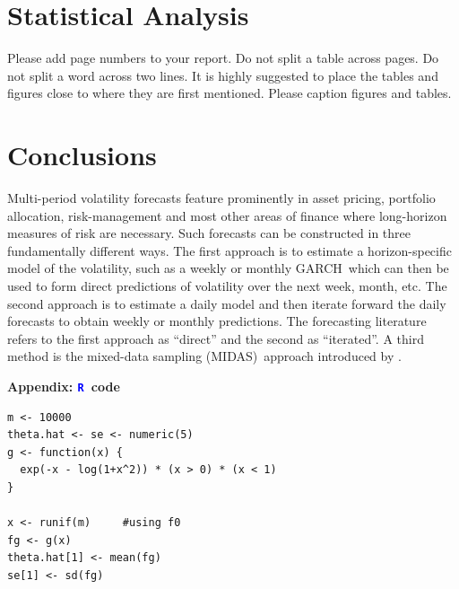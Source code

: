 \documentclass[12pt]{article}
\newcommand{\textR}[1]{\textcolor{blue}{\texttt{#1}}}
\newcommand{\R}{\textR{R}}
\begin{document}
\section{Statistical Analysis}

Please add page numbers to your report. Do not split a table across pages. Do not split a word across two lines. It is highly suggested to place the tables and figures close to where they are first mentioned. Please caption figures and tables.

\section{Conclusions}


Multi-period volatility forecasts feature prominently in asset pricing, portfolio allocation, risk-management and most other areas of finance where long-horizon measures of risk are necessary. Such forecasts can be constructed in three fundamentally different ways. The first approach is to estimate a horizon-specific model of the volatility, such as a weekly or monthly GARCH\, which can then be used to form direct predictions of volatility over the next week, month, etc. The second approach is to estimate a daily model and then iterate forward the daily forecasts to obtain weekly or monthly predictions. The forecasting literature refers to the first approach as ``direct'' and the second as ``iterated''. A third method is the mixed-data sampling (MIDAS)\ approach introduced by \cite{ghysels_etal_midas-jfe}. 


\newpage






\newpage

\appendix
\begin{center}
{\Large {\bf Appendix: \R\ code}}
\end{center}

{\footnotesize \begin{verbatim}
m <- 10000 
theta.hat <- se <- numeric(5)
g <- function(x) {
  exp(-x - log(1+x^2)) * (x > 0) * (x < 1)
}

x <- runif(m)     #using f0
fg <- g(x)
theta.hat[1] <- mean(fg)
se[1] <- sd(fg)
\end{verbatim} }
\end{document}
